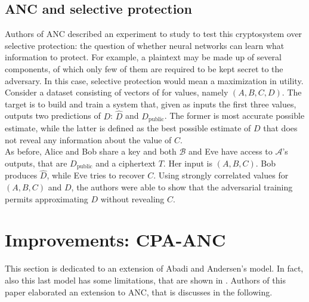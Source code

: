 \documentclass[%
    corpo=11pt,
    twoside,
    stile=classica,
    oldstyle,
    autoretitolo,
    tipotesi=magistrale,
    greek,
    evenboxes,
    english
]{toptesi}
\begin{document}
\subsection{ANC and selective protection} 
Authors of ANC described an experiment to study to test this cryptosystem over selective protection: the question of whether neural networks can learn what information to protect. For example, a plaintext may be made up of several components, of which only few of them are required to be kept secret to the adversary. In this case, selective protection would mean a maximization in utility. \\
Consider a dataset consisting of vectors of for values, namely $(A, B, C, D)$. The target is to build and train a system that, given as inputs the first three values, outputs two predictions of $D$:
$\hat{D}$ and $D_{\text{public}}$. The former is most accurate possible estimate, while the latter is defined as the best possible estimate of $D$ that does not reveal any information about the value of $C$. \\
As before, Alice and Bob share a key and both $\mathcal{B}$ and Eve have access to $\mathcal{A}$'s outputs, that are $D_{\text{public}}$ and a ciphertext $T$. Her input is $(A, B, C)$. Bob produces $\hat{D}$, while Eve tries to recover $C$. 
Using strongly correlated values for $(A, B, C)$ and $D$, the authors were able to show that the adversarial training permits approximating $D$ without revealing $C$.
\newpage

\section{Improvements: CPA-ANC}
This section is dedicated to an extension of Abadi and Andersen's model. In fact, also this last model has some limitations, that are shown in \cite{brazilians}. Authors of this paper elaborated an extension to ANC, that is discusses in the following.
\end{document}
